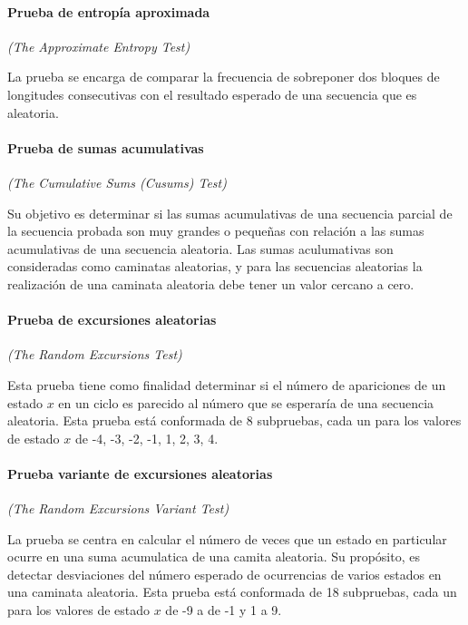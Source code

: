 \paragraph{Prueba de entropía aproximada} %
\textit{(The Approximate Entropy Test)}

La prueba se encarga de comparar la frecuencia de sobreponer dos bloques de 
longitudes consecutivas con el resultado esperado de una secuencia que es 
aleatoria. 

\paragraph{Prueba de sumas acumulativas} %
\textit{(The Cumulative Sums (Cusums) Test)}

Su objetivo es determinar si las sumas acumulativas de una secuencia parcial 
de la secuencia probada son muy grandes o pequeñas con relación a las sumas 
acumulativas de una secuencia aleatoria. Las sumas aculumativas son 
consideradas como caminatas aleatorias, y para las secuencias aleatorias 
la realización de una caminata aleatoria debe tener un valor cercano a cero. 

\paragraph{Prueba de excursiones aleatorias} %
\textit{(The Random Excursions Test)}

Esta prueba tiene como finalidad determinar si el número de apariciones de un 
estado $x$ en un ciclo es parecido al número que se esperaría de una secuencia 
aleatoria. Esta prueba está conformada de 8 subpruebas, cada un para los 
valores de estado $x$ de -4, -3, -2, -1, 1, 2, 3, 4.

\paragraph{Prueba variante de excursiones aleatorias} %
\textit{(The Random Excursions Variant Test)}

La prueba se centra en calcular el número de veces que un estado en particular 
ocurre en una suma acumulatica de una camita aleatoria. Su propósito, es 
detectar desviaciones del número esperado de ocurrencias de varios estados 
en una caminata aleatoria. Esta prueba está conformada de 18 subpruebas, cada 
un para los valores de estado $x$ de -9 a de -1 y  1 a 9.
